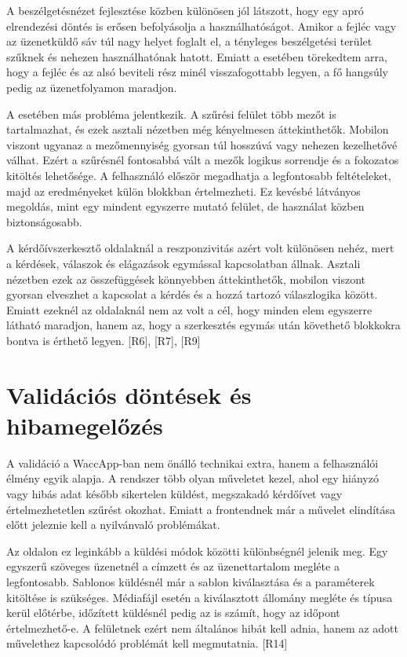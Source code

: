 A beszélgetésnézet fejlesztése közben különösen jól látszott, hogy egy apró elrendezési döntés is erősen befolyásolja a használhatóságot. Amikor a fejléc vagy az üzenetküldő sáv túl nagy helyet foglalt el, a tényleges beszélgetési terület szűknek és nehezen használhatónak hatott. Emiatt a  esetében törekedtem arra, hogy a fejléc és az alsó beviteli rész minél visszafogottabb legyen, a fő hangsúly pedig az üzenetfolyamon maradjon.

A  esetében más probléma jelentkezik. A szűrési felület több mezőt is tartalmazhat, és ezek asztali nézetben még kényelmesen áttekinthetők. Mobilon viszont ugyanaz a mezőmennyiség gyorsan túl hosszúvá vagy nehezen kezelhetővé válhat. Ezért a szűrésnél fontosabbá vált a mezők logikus sorrendje és a fokozatos kitöltés lehetősége. A felhasználó először megadhatja a legfontosabb feltételeket, majd az eredményeket külön blokkban értelmezheti. Ez kevésbé látványos megoldás, mint egy mindent egyszerre mutató felület, de használat közben biztonságosabb.

A kérdőívszerkesztő oldalaknál a reszponzivitás azért volt különösen nehéz, mert a kérdések, válaszok és elágazások egymással kapcsolatban állnak. Asztali nézetben ezek az összefüggések könnyebben áttekinthetők, mobilon viszont gyorsan elveszhet a kapcsolat a kérdés és a hozzá tartozó válaszlogika között. Emiatt ezeknél az oldalaknál nem az volt a cél, hogy minden elem egyszerre látható maradjon, hanem az, hogy a szerkesztés egymás után követhető blokkokra bontva is érthető legyen. [R6], [R7], [R9]

\section{Validációs döntések és hibamegelőzés}

A validáció a WaccApp-ban nem önálló technikai extra, hanem a felhasználói élmény egyik alapja. A rendszer több olyan műveletet kezel, ahol egy hiányzó vagy hibás adat később sikertelen küldést, megszakadó kérdőívet vagy értelmezhetetlen szűrést okozhat. Emiatt a frontendnek már a művelet elindítása előtt jeleznie kell a nyilvánvaló problémákat.

Az  oldalon ez leginkább a küldési módok közötti különbségnél jelenik meg. Egy egyszerű szöveges üzenetnél a címzett és az üzenettartalom megléte a legfontosabb. Sablonos küldésnél már a sablon kiválasztása és a paraméterek kitöltése is szükséges. Médiafájl esetén a kiválasztott állomány megléte és típusa kerül előtérbe, időzített küldésnél pedig az is számít, hogy az időpont értelmezhető-e. A felületnek ezért nem általános hibát kell adnia, hanem az adott művelethez kapcsolódó problémát kell megmutatnia. [R14]

